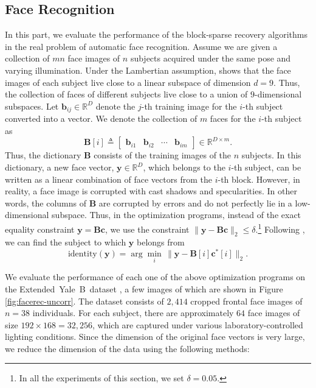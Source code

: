 \documentclass[10pt,twocolumn,twoside] {IEEEtran}
\begin{document}
{\subsection{Face Recognition}
In this part, we evaluate the performance of the block-sparse recovery algorithms in the real problem of automatic face recognition. Assume we are given a collection of $m n$ face images of $n$ subjects acquired under the same pose and varying illumination. Under the Lambertian assumption, \cite{Basri:PAMI03} shows that the face images of each subject live close to a linear subspace of dimension $d=9$. Thus, the collection of faces of different subjects live close to a union of $9$-dimensional subspaces. 
Let ${\boldsymbol{b}}_{ij} \in {\mathbb{R}}^D$ denote the $j$-th training image for the $i$-th subject converted into a vector.
We denote the collection of $m$ faces for the $i$-th subject as 
\begin{equation}
{\boldsymbol{B}}[i] \triangleq \begin{bmatrix} {\boldsymbol{b}}_{i1} & {\boldsymbol{b}}_{i2} & \cdots & {\boldsymbol{b}}_{im} \end{bmatrix} \in {\mathbb{R}}^{D \times m}.
\end{equation}
Thus, the dictionary ${\boldsymbol{B}}$ consists of the training images of the $n$ subjects. In this dictionary, a new face vector, ${\boldsymbol{y}} \in {\mathbb{R}}^D$, which belongs to the $i$-th subject, can be written as a linear combination of face vectors from the $i$-th block. However, in reality, a face image is corrupted with cast shadows and specularities. In other words, the columns of ${\boldsymbol{B}}$ are corrupted by errors and do not perfectly lie in a low-dimensional subspace. Thus, in the optimization programs, instead of the exact equality constraint ${\boldsymbol{y}} = {\boldsymbol{B}} {\boldsymbol{c}}$, we use the constraint $\| {\boldsymbol{y}} - {\boldsymbol{B}} {\boldsymbol{c}} \|_2 \leq \delta$.\footnote{In all the experiments of this section, we set $\delta = 0.05$.} 
Following \cite{Wright:PAMI09}, we can find the subject to which ${\boldsymbol{y}}$ belongs from
\begin{equation}
\label{eq:faceidentity}
\text{identity}({\boldsymbol{y}}) = \operatorname{arg}\!\min_{i} \, \| {\boldsymbol{y}} -  {\boldsymbol{B}}[i] {\boldsymbol{c}}^*[i] \|_2.
\end{equation}

We evaluate the performance of each one of the above optimization programs on the Extended~Yale~B~dataset \cite{Kriegman:PAMI05}, a few images of which are shown in Figure \ref{fig:facerec-uncorr}. The dataset consists of $2,414$ cropped frontal face images of $n = 38$ individuals. For each subject, there are approximately $64$ face images of size $192 \times 168 = 32,256$, which are captured under various laboratory-controlled lighting conditions. Since the dimension of the original face vectors is very large, we reduce the dimension of the data using the following methods:

}
\end{document}
